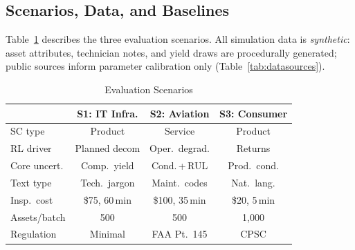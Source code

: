 \documentclass[conference]{IEEEtran}
\begin{document}
\subsection{Scenarios, Data, and Baselines}

Table~\ref{tab:scenarios} describes the three evaluation scenarios. All
simulation data is \emph{synthetic}: asset attributes, technician notes, and
yield draws are procedurally generated; public sources inform parameter
calibration only (Table~\ref{tab:datasources}).

\begin{table}[!t]
\caption{Evaluation Scenarios}
\label{tab:scenarios}
\centering\small
\begin{tabular}{lccc}
\toprule
 & S1: IT Infra. & S2: Aviation & S3: Consumer \\
\midrule
SC type        & Product       & Service        & Product     \\
RL driver      & Planned decom & Oper.\ degrad. & Returns     \\
Core uncert.   & Comp.\ yield  & Cond.\,+\,RUL  & Prod.\ cond.\\
Text type      & Tech.\ jargon & Maint.\ codes  & Nat.\ lang. \\
Insp.\ cost    & \$75, 60\,min & \$100, 35\,min & \$20, 5\,min\\
Assets/batch   & 500           & 500            & 1,000       \\
Regulation     & Minimal       & FAA Pt.\ 145   & CPSC        \\
\bottomrule
\end{tabular}
\end{table}
\end{document}
